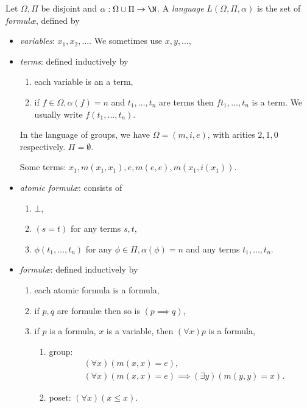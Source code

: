 \documentclass[a4paper]{article}
\begin{document}
\begin{definition}[Language]
  Let \(\Omega, \Pi\) be disjoint and \(\alpha: \Omega \cup \Pi \to \N\). A \emph{language} \(L(\Omega, \Pi, \alpha)\) is the set of \emph{formulæ}, defined by
  \begin{itemize}
  \item \emph{variables}: \(x_1, x_2, \dots\). We sometimes use \(x, y, \dots\),
  \item \emph{terms}: defined inductively by
    \begin{enumerate}
    \item each variable is an a term,
    \item if \(f \in \Omega, \alpha(f) = n\) and \(t_1, \dots, t_n\) are terms then \(ft_1, \dots, t_n\) is a term. We usually write \(f(t_1, \dots, t_n)\).
    \end{enumerate}
    \begin{eg}
      In the language of groups, we have \(\Omega = (m, i, e)\), with arities \(2, 1, 0\) respectively. \(\Pi = \emptyset\).

      Some terms: \(x_1, m(x_1, x_1), e, m(e, e), m(x_1, i(x_1))\).
    \end{eg}
  \item \emph{atomic formulæ}: consists of
    \begin{enumerate}
    \item \(\bot\),
    \item \((s = t)\) for any terms \(s, t\),
    \item \(\phi(t_1, \dots, t_n)\) for any \(\phi \in \Pi, \alpha(\phi) = n\) and any terms \(t_1, \dots, t_n\).
    \end{enumerate}
  \item \emph{formulæ}: defined inductively by
    \begin{enumerate}
    \item each atomic formula is a formula,
    \item if \(p, q\) are formulæ then so is \((p \implies q)\),
    \item if \(p\) is a formula, \(x\) is a variable, then \((\forall x) p\) is a formula,
      \begin{eg}\leavevmode
        \begin{enumerate}
        \item group:
          \begin{align*}
            & (\forall x) (m(x, x) = e), \\
            & (\forall x) (m(x, x) = e) \implies (\exists y)(m(y, y) = x).
          \end{align*}
        \item poset: \((\forall x) (x \leq x)\).
        \end{enumerate}
      \end{eg}
    \end{enumerate}
  \end{itemize}
\end{definition}
\end{document}
